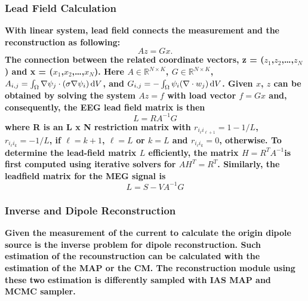 \documentclass[5p]{elsarticle}
\begin{document}
\begin{frontmatter}
\subsubsection{Lead Field Calculation}
\bf With linear system,  lead field connects the measurement and the reconstruction as following: 
\begin{equation} 
Az = Gx.\end{equation}
The connection between the related coordinate 
vectors, z = ($z_{1}$,$ z_{2}$,\ldots ,$ z_{N}$) and x = ($
x_{1}$,$ x_{2}$,\ldots ,$ x_{N}$).
Here $A \in \mathbb{R}^{N \times K}$, $G \in \mathbb{R}^{N \times K}$, $A_{i,j} = \int_{\Omega 
}{\nabla \psi _{j} \cdot (\sigma \nabla \psi _{i})} \, \hbox{d} V$, and $
G_{i,j}=
- \int_{\Omega }
{\psi _{i}(\nabla \cdot {w_{j}}) \, \hbox{d}V}$.  Given $x$, $z$ 
can be obtained by solving the system $Az = f$ with load vector $f = G x$ and, 
consequently, the EEG lead field matrix is then
\begin{equation} \label{eeg_lead_field} L = RA^{-1}G \end{equation}
where R is an L x N restriction matrix with $r_{i_{\ell}i_{\ell+1}}=1-1/L$,
$ r_{i_{\ell}i_{k}}=-1/L$, if $\ell = k+1$, $\ell = L$ or $k = L$ and $r_{i_{\ell}i_{k}}=0
$, otherwise. To determine the lead-field matrix $L$ efficiently, the matrix $
H= R^{T}A^{-1}$is first computed using iterative solvers for  $AH^{T}=R^{T}$.
Similarly, the leadfield matrix for the MEG signal is \begin{equation}\label{meg_lead_field} L = S-VA^{-1}G \end{equation}

\subsubsection{Inverse and Dipole Reconstruction}
\bf Given the measurement of the current to calculate the origin dipole source is the inverse problem for dipole reconstruction. Such estimation of the recounstruction can be calculated with the estimation of the MAP or the CM. The reconstruction module using these two estimation is differently sampled with IAS MAP and MCMC sampler. 


\end{frontmatter}
\end{document}

